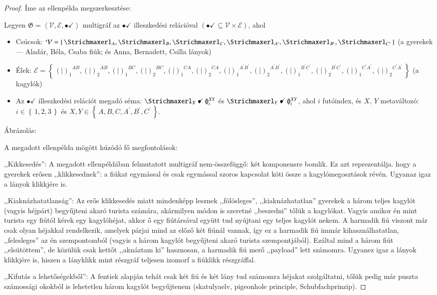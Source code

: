 \documentclass{article}
\newcommand{\she}[1]{\ensuremath{\Strichmaxerl_{#1}}}
\newcommand{\oys}[1]{\ensuremath{(\!|\!)_{#1}}}
\newcommand{\incidsymbol}{\bullet\!\!\!\checkmark}
\newcommand{\incid}{\mathrel{\incidsymbol}} %
\begin{document}
	\begin{proof}
		Íme az ellenpélda megszerkesztése:

		Legyen $\mathfrak G = \left\langle \mathcal V, \mathcal E, \incidsymbol\right\rangle$ multigráf az $\incidsymbol$ illeszkedési relációval $\left(\incidsymbol \subseteq \mathcal V \times \mathcal E\right)$, ahol
		\begin{itemize}
			\item Csúcsok: $\mathcal V = \left\lbrace\,\she A, \she B, \she C, \she{A^\prime}, \she{B^\prime}, \she{C^\prime} \,\right\rbrace$ (a gyerekek --- Aladár, Béla, Csaba fiúk; és Anna, Bernadett, Csilla lányok)
			\item Élek: $\mathcal E = \left\lbrace\,\oys1^{AB}, \oys2^{AB}, \oys1^{BC}, \oys2^{BC}, \oys1^{CA}, \oys2^{CA}, \oys1^{A^\prime B^\prime}, \oys2^{A^\prime B^\prime}, \oys1^{B^\prime C^\prime}, \oys2^{B^\prime C^\prime}, \oys1^{C^\prime A^\prime}, \oys2^{C^\prime A^\prime}  \,\right\rbrace$ (a kagylók)
			\item  Az $\incidsymbol$ illeszkedési relációt megadó séma: $\she X \incid \oys{i}^{XY}$ és $\she Y \incid \oys{i}^{XY}$, ahol $i$ futóindex, és $X$, $Y$ metaváltozó: $i \in \left\lbrace\,1,2,3\,\right\rbrace$ és $X, Y \in \left\lbrace\,A, B, C, A^\prime, B^\prime, C^\prime\,\right\rbrace$.
		\end{itemize}

		Ábrázolás:

		

		A megadott ellenpélda mögött húzódó fő megfontolások:

		,,Kikkesedés'': A megadott ellenpéldában felmutatott multigráf nem-összefüggő: két komponensre bomlik. Ez azt reprezentálja. hogy a gyerekek erősen ,,klikkesednek'': a fiúkat egymással és  csak egymással szoros kapcsolat köti össze a kagylómegosztások révén. Ugyanaz igaz a lányok klikkjére is.

		,,Kiaknázhatatlanság'': Az erős klikkesedés miatt mindenképp lesznek ,,fölösleges'', ,,kiaknázhatatlan'' gyerekek a három teljes kagylót (vagyis héjpárt) begyűjteni akaró turista számára, akármilyen módon is szeretné ,,beszedni'' tőlük a kagylókat. Vagyis amikor én mint turista egy fiútól kérek egy kagylóhéjat, akkor ő egy fiútársával együtt tud nyújtani egy teljes kagylót nekem. A harmadik fiú viszont már csak olyan héjakkal rendelkezik, amelyek párjai mind az előző két fiúnál vannak, így ez a harmadik fiú immár kihasználhatatlan, ,,felesleges'' az én szempontomból (vagyis a három kagylót begyűjteni akaró turista szempontjából). Ezáltal mind a három fiút ,,elsütöttem'', de közülük csak kettőt ,,aknáztam ki'' hasznosan, a harmadik fiú merő ,,payload'' lett számomra. Ugyanez igaz a lányok klikkjére is, hiszen a lányklikk mint  részgráf teljesen izomorf a fiúklikk részgráffal.

		,,Kifutás a lehetőségekből'': A fentiek alapján tehát csak két fiú és két lány tud számomra héjakat szolgáltatni,  tőlük pedig már puszta számossági okokból is lehetetlen három kagylót begyűjtenem (skatulyaelv, pigeonhole principle, Schubfachprinzip).
	\end{proof}
\end{document}
